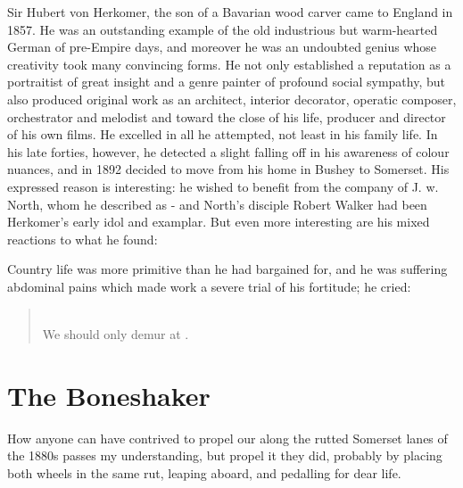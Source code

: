 Sir Hubert von Herkomer, the son of a Bavarian wood carver came to England in 1857. He was an outstanding example of the old industrious but warm-hearted German of pre-Empire days, and moreover he was an undoubted genius whose creativity took many convincing forms. He not only established a reputation as a portraitist of great insight and a genre painter of profound social sympathy, but also produced original work as an architect, interior decorator, operatic composer, orchestrator and melodist and toward the close of his life, producer and director of his own films. He excelled in all he attempted, not least in his family life. In his late forties, however, he detected a slight falling off in his awareness of colour nuances, and in 1892 decided to move from his home in Bushey to Somerset. His expressed reason is interesting: he wished to benefit from the company of J. w.  North, whom he described as  - and North's disciple Robert Walker had been Herkomer's early idol and examplar. But even more interesting are his mixed reactions to what he found:

 Country life was more primitive than he had bargained for, and he was suffering abdominal pains which made work a severe trial of his fortitude;  he cried:

\begin{quote}
 \\
We should only demur at .
\end{quote}


\section{The Boneshaker}

How anyone can have contrived to propel our  along the rutted Somerset lanes of the 1880s passes my understanding, but propel it they did, probably by placing both wheels in the same rut, leaping aboard, and pedalling for dear life.

